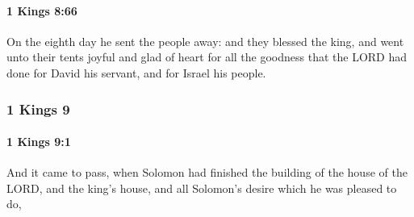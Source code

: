 		\paragraph{1 Kings 8:66} %
			\label{1KINGS-8-66}

			On the eighth day he sent the people away: and they blessed the king, and went unto their tents joyful and glad of heart for all the goodness that the LORD had done for David his servant, and for Israel his people.

	\subsubsection{1 Kings 9} %
		\label{1KINGS-9}

		\paragraph{1 Kings 9:1} %
			\label{1KINGS-9-1}

			And it came to pass, when Solomon had finished the building of the house of the LORD, and the king’s house, and all Solomon’s desire which he was pleased to do,

